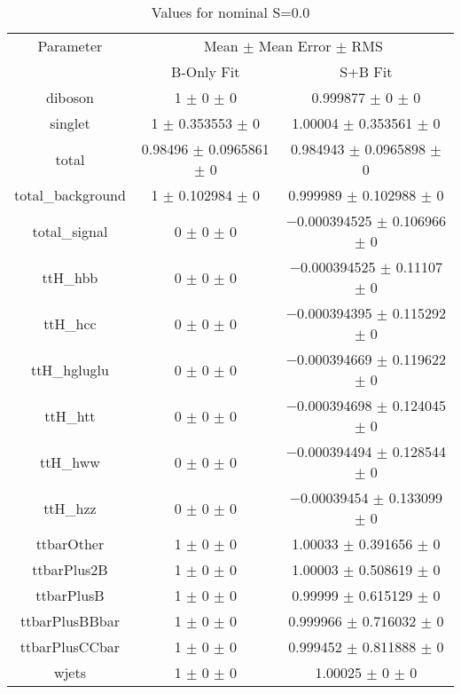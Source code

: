 \begin{table}
\centering
\caption{Values for nominal S=0.0}
\begin{tabular}{ccc}
\toprule
Parameter & \multicolumn{2}{c}{Mean $\pm$ Mean Error $\pm$ RMS}\\
 & B-Only Fit & S+B Fit\\
\midrule
diboson & \num{1} $\pm$ \num{0} $\pm$ \num{0} & \num{0.999877} $\pm$ \num{0} $\pm$ \num{0}\\
singlet & \num{1} $\pm$ \num{0.353553} $\pm$ \num{0} & \num{1.00004} $\pm$ \num{0.353561} $\pm$ \num{0}\\
total & \num{0.98496} $\pm$ \num{0.0965861} $\pm$ \num{0} & \num{0.984943} $\pm$ \num{0.0965898} $\pm$ \num{0}\\
total\_background & \num{1} $\pm$ \num{0.102984} $\pm$ \num{0} & \num{0.999989} $\pm$ \num{0.102988} $\pm$ \num{0}\\
total\_signal & \num{0} $\pm$ \num{0} $\pm$ \num{0} & \num{-0.000394525} $\pm$ \num{0.106966} $\pm$ \num{0}\\
ttH\_hbb & \num{0} $\pm$ \num{0} $\pm$ \num{0} & \num{-0.000394525} $\pm$ \num{0.11107} $\pm$ \num{0}\\
ttH\_hcc & \num{0} $\pm$ \num{0} $\pm$ \num{0} & \num{-0.000394395} $\pm$ \num{0.115292} $\pm$ \num{0}\\
ttH\_hgluglu & \num{0} $\pm$ \num{0} $\pm$ \num{0} & \num{-0.000394669} $\pm$ \num{0.119622} $\pm$ \num{0}\\
ttH\_htt & \num{0} $\pm$ \num{0} $\pm$ \num{0} & \num{-0.000394698} $\pm$ \num{0.124045} $\pm$ \num{0}\\
ttH\_hww & \num{0} $\pm$ \num{0} $\pm$ \num{0} & \num{-0.000394494} $\pm$ \num{0.128544} $\pm$ \num{0}\\
ttH\_hzz & \num{0} $\pm$ \num{0} $\pm$ \num{0} & \num{-0.00039454} $\pm$ \num{0.133099} $\pm$ \num{0}\\
ttbarOther & \num{1} $\pm$ \num{0} $\pm$ \num{0} & \num{1.00033} $\pm$ \num{0.391656} $\pm$ \num{0}\\
ttbarPlus2B & \num{1} $\pm$ \num{0} $\pm$ \num{0} & \num{1.00003} $\pm$ \num{0.508619} $\pm$ \num{0}\\
ttbarPlusB & \num{1} $\pm$ \num{0} $\pm$ \num{0} & \num{0.99999} $\pm$ \num{0.615129} $\pm$ \num{0}\\
ttbarPlusBBbar & \num{1} $\pm$ \num{0} $\pm$ \num{0} & \num{0.999966} $\pm$ \num{0.716032} $\pm$ \num{0}\\
ttbarPlusCCbar & \num{1} $\pm$ \num{0} $\pm$ \num{0} & \num{0.999452} $\pm$ \num{0.811888} $\pm$ \num{0}\\
wjets & \num{1} $\pm$ \num{0} $\pm$ \num{0} & \num{1.00025} $\pm$ \num{0} $\pm$ \num{0}\\
\bottomrule
\end{tabular}
\end{table}